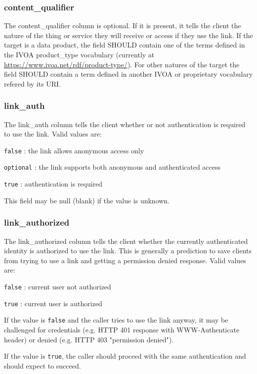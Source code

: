 \documentclass[11pt,a4paper]{ivoa}
\begin{document}
\subsubsection{content\_qualifier}

The content\_qualifier column is optional. If it is present, it tells 
the client the nature of the thing or service they will receive or access 
if they use the link. If the target is a data product, the field SHOULD contain 
one of the terms defined in the IVOA product\_type vocabulary (currently at 
\url{https://www.ivoa.net/rdf/product-type/}). For other natures of the target 
the field SHOULD contain a term defined in another IVOA or proprietary vocabulary 
refered by its URI.

\subsubsection{link\_auth}

The link\_auth column tells the client whether or not authentication is required 
to use the link. Valid values are:

\verb|false| : the link allows anonymous access only

\verb|optional| : the link supports both anonymous and authenticated access

\verb|true| : authentication is required

This field may be null (blank) if the value is unknown.

\subsubsection{link\_authorized}

The link\_authorized column tells the client whether the currently authenticated 
identity is authorized to use the link. This is generally a prediction to save 
clients from trying to use a link and getting a permission denied response. Valid 
values are:

\verb|false| : current user not authorized

\verb|true| : current user is authorized

If the value is \verb|false| and the caller tries to use the link anyway, it may be 
challenged for credentials (e.g. HTTP 401 response with WWW-Authenticate header) or 
denied (e.g. HTTP 403 "permission denied").

If the value is \verb|true|, the caller should proceed with the same authentication
and should expect to succeed.
\end{document}
